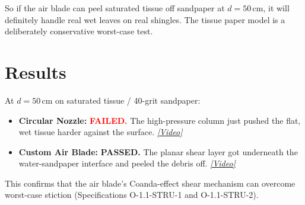 \documentclass[12pt, letterpaper]{article}
\begin{document}
So if the air blade can peel saturated tissue off sandpaper at $d = 50$\,cm, it will definitely handle real wet leaves on real shingles. The tissue paper model is a deliberately conservative worst-case test.

\section{Results}

At $d = 50$\,cm on saturated tissue / 40-grit sandpaper:
\begin{itemize}
    \item \textbf{Circular Nozzle:} \textcolor{red}{\textbf{FAILED.}} The high-pressure column just pushed the flat, wet tissue harder against the surface. \href{https://drive.google.com/file/d/1wO-Wh8iFGygEvBvc3OOH91XQSwhoY_Ws/view}{\textit{[Video]}}
    \item \textbf{Custom Air Blade:} \textcolor{green!50!black}{\textbf{PASSED.}} The planar shear layer got underneath the water-sandpaper interface and peeled the debris off. \href{https://drive.google.com/file/d/16htpF3ptwKEM5UxYE679x3f3xWmt80h1/view}{\textit{[Video]}}
\end{itemize}

This confirms that the air blade's Coanda-effect shear mechanism can overcome worst-case stiction (Specifications O-1.1-STRU-1 and O-1.1-STRU-2).
\end{document}
